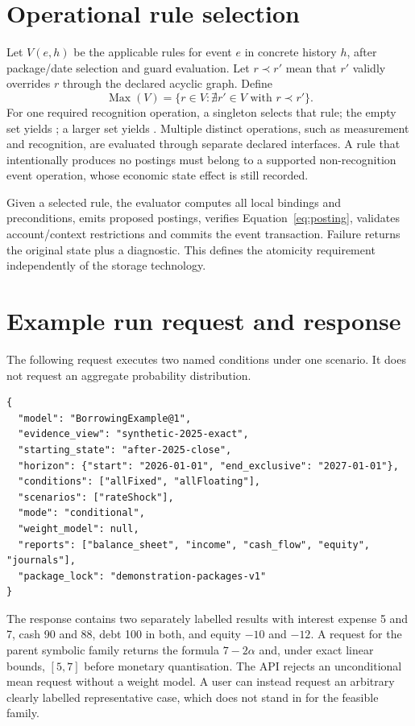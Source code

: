 \section{Operational rule selection}

Let $V(e,h)$ be the applicable rules for event $e$ in concrete history $h$,
after package/date selection and guard evaluation. Let $r\prec r'$ mean that
$r'$ validly overrides $r$ through the declared acyclic graph. Define
\[
 \operatorname{Max}(V)=\{r\in V:\nexists r'\in V\text{ with }r\prec r'\}.
\]
For one required recognition operation, a singleton selects that rule; the
empty set yields ; a larger set yields
. Multiple distinct operations, such as measurement and
recognition, are evaluated through separate declared interfaces. A rule that
intentionally produces no postings must belong to a supported non-recognition
event operation, whose economic state effect is still recorded.

Given a selected rule, the evaluator computes all local bindings and
preconditions, emits proposed postings, verifies
Equation~\eqref{eq:posting}, validates account/context restrictions and commits
the event transaction. Failure returns the original state plus a diagnostic.
This defines the atomicity requirement independently of the storage technology.

\begin{minipage}{\linewidth}
\section{Example run request and response}

The following request executes two named conditions under one scenario. It
does not request an aggregate probability distribution.

\begin{lstlisting}
{
  "model": "BorrowingExample@1",
  "evidence_view": "synthetic-2025-exact",
  "starting_state": "after-2025-close",
  "horizon": {"start": "2026-01-01", "end_exclusive": "2027-01-01"},
  "conditions": ["allFixed", "allFloating"],
  "scenarios": ["rateShock"],
  "mode": "conditional",
  "weight_model": null,
  "reports": ["balance_sheet", "income", "cash_flow", "equity", "journals"],
  "package_lock": "demonstration-packages-v1"
}
\end{lstlisting}
\end{minipage}

The response contains two separately labelled results with interest expense
5 and 7, cash 90 and 88, debt 100 in both, and equity $-10$ and $-12$.
A request for the parent symbolic family returns the formula
$7-2\alpha$ and, under exact linear bounds, $[5,7]$ before monetary
quantisation. The API rejects an unconditional mean request without a weight
model. A user can instead request an arbitrary clearly labelled representative
case, which does not stand in for the feasible family.

